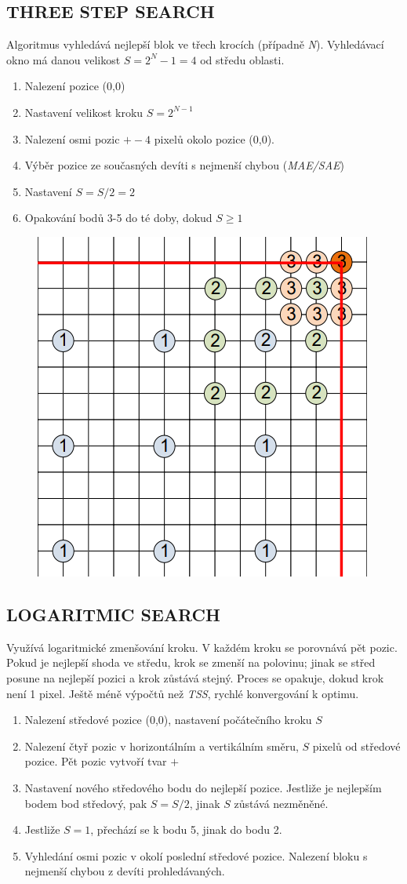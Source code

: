 \subsection{THREE STEP SEARCH}

Algoritmus vyhledává nejlepší blok ve třech krocích (případně \textit{N}). Vyhledávací
okno má danou velikost $S=2^{N}-1=4$ od středu oblasti.

\begin{enumerate}
    \item Nalezení pozice (0,0)
    \item Nastavení velikost kroku $S=2^{N-1}$
    \item Nalezení osmi pozic $+-4$ pixelů okolo pozice (0,0).
    \item Výběr pozice ze současných devíti s nejmenší chybou (\textit{MAE/SAE})
    \item Nastavení $S=S/2=2$
    \item Opakování bodů 3-5 do té doby, dokud $S\geq1$    
\end{enumerate}

\begin{figure}[ht]
    \centering
    \includegraphics[width=0.3\linewidth]{images/tree.png}
\end{figure}
\FloatBarrier

\subsection{LOGARITMIC SEARCH}

Využívá logaritmické zmenšování kroku. V každém kroku se porovnává pět pozic. Pokud je nejlepší shoda ve středu, krok se zmenší na polovinu; jinak se střed posune na nejlepší pozici a krok zůstává stejný. Proces se opakuje, dokud krok není 1 pixel. Ještě méně výpočtů než \textit{TSS}, rychlé konvergování k optimu.

\begin{enumerate}
    \item Nalezení středové pozice (0,0), nastavení počátečního kroku $S$
    \item Nalezení čtyř pozic v horizontálním a vertikálním směru, $S$ pixelů od středové pozice. Pět pozic vytvoří tvar $+$
    \item Nastavení nového středového bodu do nejlepší pozice. Jestliže je nejlepším bodem bod středový, pak $S=S/2$, jinak $S$ zůstává nezměněné.
    \item Jestliže $S=1$, přechází se k bodu 5, jinak do bodu 2.
    \item Vyhledání osmi pozic v okolí poslední středové pozice. Nalezení bloku s nejmenší chybou z devíti prohledávaných.
\end{enumerate}

